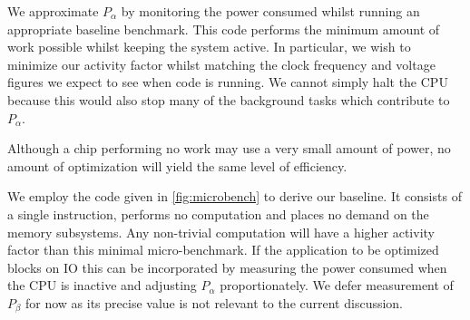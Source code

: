 We approximate $P_{\alpha}$ by monitoring the power consumed whilst running an appropriate baseline benchmark. This code performs the minimum amount of work possible whilst keeping the system active. In particular, we wish to minimize our activity factor whilst matching the clock frequency and voltage figures we expect to see when code is running. We cannot simply halt the CPU because this would also stop many of the background tasks which contribute to $P_{\alpha}$.

Although a chip performing no work may use a very small amount of power, no amount of optimization will yield the same level of efficiency.


We employ the code given in \autoref{fig:microbench} to derive our baseline.  It consists of a single instruction, performs no computation and places no demand on the memory subsystems. Any non-trivial computation will have a higher activity factor than this minimal micro-benchmark. If the application to be optimized blocks on IO this can be incorporated by measuring the power consumed when the CPU is inactive and adjusting $P_\alpha$ proportionately. We defer measurement of $P_{\beta}$ for now as its precise value is not relevant to the current discussion. 





